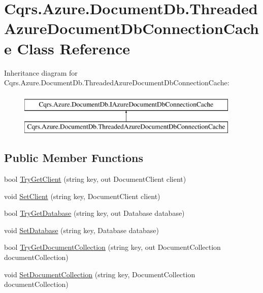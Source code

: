 \hypertarget{classCqrs_1_1Azure_1_1DocumentDb_1_1ThreadedAzureDocumentDbConnectionCache}{}\section{Cqrs.\+Azure.\+Document\+Db.\+Threaded\+Azure\+Document\+Db\+Connection\+Cache Class Reference}
\label{classCqrs_1_1Azure_1_1DocumentDb_1_1ThreadedAzureDocumentDbConnectionCache}
Inheritance diagram for Cqrs.\+Azure.\+Document\+Db.\+Threaded\+Azure\+Document\+Db\+Connection\+Cache\+:\begin{figure}[H]
\begin{center}
\leavevmode
\includegraphics[height=2.000000cm]{classCqrs_1_1Azure_1_1DocumentDb_1_1ThreadedAzureDocumentDbConnectionCache}
\end{center}
\end{figure}
\subsection*{Public Member Functions}
\begin{DoxyCompactItemize}
\item 
bool \hyperlink{classCqrs_1_1Azure_1_1DocumentDb_1_1ThreadedAzureDocumentDbConnectionCache_a0cf4a79ec6bcc1021182f95ddc27edea}{Try\+Get\+Client} (string key, out Document\+Client client)
\item 
void \hyperlink{classCqrs_1_1Azure_1_1DocumentDb_1_1ThreadedAzureDocumentDbConnectionCache_a4fbbe06abc4c5664243b7be029a4031f}{Set\+Client} (string key, Document\+Client client)
\item 
bool \hyperlink{classCqrs_1_1Azure_1_1DocumentDb_1_1ThreadedAzureDocumentDbConnectionCache_a00ea55a85c74b84cfc5f2007e3bc9be3}{Try\+Get\+Database} (string key, out Database database)
\item 
void \hyperlink{classCqrs_1_1Azure_1_1DocumentDb_1_1ThreadedAzureDocumentDbConnectionCache_ab3c996b8e717aec1e4fc2a70fea52d53}{Set\+Database} (string key, Database database)
\item 
bool \hyperlink{classCqrs_1_1Azure_1_1DocumentDb_1_1ThreadedAzureDocumentDbConnectionCache_a0986cecb40fc143751abb4605f507975}{Try\+Get\+Document\+Collection} (string key, out Document\+Collection document\+Collection)
\item 
void \hyperlink{classCqrs_1_1Azure_1_1DocumentDb_1_1ThreadedAzureDocumentDbConnectionCache_a069d9161ed5649cc3e65cda641d5173d}{Set\+Document\+Collection} (string key, Document\+Collection document\+Collection)
\end{DoxyCompactItemize}


